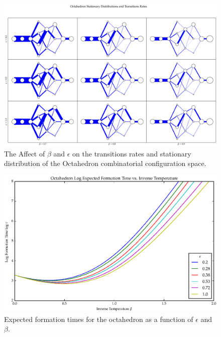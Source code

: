 \begin{figure}[ht]
\label{fig:OctaPiGrid}
\centering
  \includegraphics[scale=0.22]{images/octahedron_pi_Q_grid.eps}
\caption{The Affect of $\beta$ and $\epsilon$ on the transitions rates and stationary distribution of the Octahedron combinatorial configuration space.}
\end{figure}

\begin{figure}[ht]
\label{fig:OctaTau}
\centering
  \includegraphics[scale=0.6]{images/octahedron_tau.eps}
\caption{Expected formation times for the octahedron as a function of $\epsilon$ and $\beta$.}
\end{figure}

